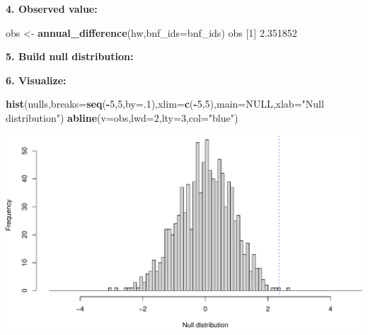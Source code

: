 \documentclass[
]{book}
\newenvironment{Shaded}{\begin{snugshade}}{\end{snugshade}}
\newcommand{\ControlFlowTok}[1]{\textcolor[rgb]{0.13,0.29,0.53}{\textbf{#1}}}
\newcommand{\DataTypeTok}[1]{\textcolor[rgb]{0.13,0.29,0.53}{#1}}
\newcommand{\DecValTok}[1]{\textcolor[rgb]{0.00,0.00,0.81}{#1}}
\newcommand{\FloatTok}[1]{\textcolor[rgb]{0.00,0.00,0.81}{#1}}
\newcommand{\KeywordTok}[1]{\textcolor[rgb]{0.13,0.29,0.53}{\textbf{#1}}}
\newcommand{\NormalTok}[1]{#1}
\newcommand{\OperatorTok}[1]{\textcolor[rgb]{0.81,0.36,0.00}{\textbf{#1}}}
\newcommand{\OtherTok}[1]{\textcolor[rgb]{0.56,0.35,0.01}{#1}}
\newcommand{\StringTok}[1]{\textcolor[rgb]{0.31,0.60,0.02}{#1}}
\begin{document}
\textbf{4. Observed value:}

\begin{Shaded}
\begin{Highlighting}[]
\NormalTok{obs <-}\StringTok{ }\KeywordTok{annual_difference}\NormalTok{(hw,}\DataTypeTok{bnf_ids=}\NormalTok{bnf_ids)}
\NormalTok{obs }
\NormalTok{[}\DecValTok{1}\NormalTok{] }\FloatTok{2.351852}
\end{Highlighting}
\end{Shaded}

\textbf{5. Build null distribution:}

\begin{Shaded}
\end{Shaded}

\textbf{6. Visualize:}

\begin{Shaded}
\begin{Highlighting}[]
\KeywordTok{hist}\NormalTok{(nulls,}\DataTypeTok{breaks=}\KeywordTok{seq}\NormalTok{(}\OperatorTok{-}\DecValTok{5}\NormalTok{,}\DecValTok{5}\NormalTok{,}\DataTypeTok{by=}\NormalTok{.}\DecValTok{1}\NormalTok{),}\DataTypeTok{xlim=}\KeywordTok{c}\NormalTok{(}\OperatorTok{-}\DecValTok{5}\NormalTok{,}\DecValTok{5}\NormalTok{),}\DataTypeTok{main=}\OtherTok{NULL}\NormalTok{,}\DataTypeTok{xlab=}\StringTok{"Null distribution"}\NormalTok{)}
\KeywordTok{abline}\NormalTok{(}\DataTypeTok{v=}\NormalTok{obs,}\DataTypeTok{lwd=}\DecValTok{2}\NormalTok{,}\DataTypeTok{lty=}\DecValTok{3}\NormalTok{,}\DataTypeTok{col=}\StringTok{"blue"}\NormalTok{)}
\end{Highlighting}
\end{Shaded}

\includegraphics{figures/unnamed-chunk-603-1.pdf}
\end{document}
